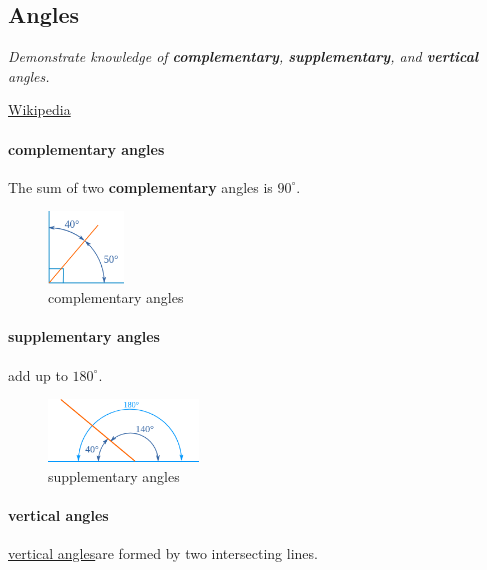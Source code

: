 
\subsection{Angles}

\textit{Demonstrate knowledge of \textbf{complementary}, \textbf{supplementary}, and \textbf{vertical} angles.}

\vspace{.25cm}

\href{https://en.wikipedia.org/wiki/Angle}{Wikipedia}



\paragraph*{complementary angles}

The sum of two \textbf{complementary} angles is $90^\circ$.

\begin{figure}[h!]
    \centering
    \includegraphics[width=2cm]{./public/images/complementary}
    \caption[short]{complementary angles}
\end{figure}


\paragraph{supplementary angles}add up to $ 180^\circ$.

\begin{figure}[h!]
    \centering
    \includegraphics[width=4cm]{./public/images/supplementary}
    \caption[short]{supplementary angles}
\end{figure}

\paragraph*{vertical angles}

\href{https://en.wikipedia.org/wiki/Angle#Vertical_and_adjacent_angle_pairs}{vertical angles}are formed by two intersecting lines.